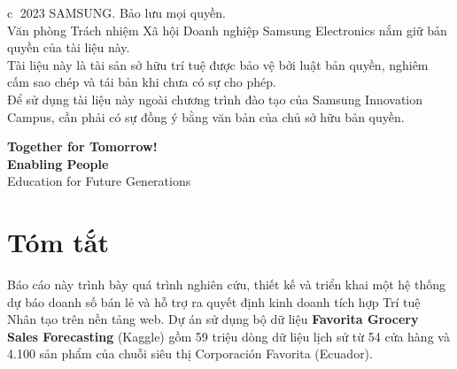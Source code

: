 \documentclass[12pt,a4paper]{report}
\begin{document}
\begin{titlepage}
\vfill

\noindent
\begin{minipage}{0.95\textwidth}
\scriptsize\color{black!80}
\textcircled{\scriptsize c} 2023 SAMSUNG. Bảo lưu mọi quyền.\\
Văn phòng Trách nhiệm Xã hội Doanh nghiệp Samsung Electronics nắm giữ bản quyền của tài liệu này.\\
Tài liệu này là tài sản sở hữu trí tuệ được bảo vệ bởi luật bản quyền, nghiêm cấm sao chép và tái bản khi chưa có sự cho phép.\\
Để sử dụng tài liệu này ngoài chương trình đào tạo của Samsung Innovation Campus, cần phải có sự đồng ý bằng văn bản của chủ sở hữu bản quyền.
\end{minipage}

\vspace{0.4cm}

\begin{center}
{\footnotesize\color{tagblue}\textbf{Together for Tomorrow!}}\\[1pt]
{\Large\color{tagblue}\textbf{Enabling People}}\\[1pt]
{\tiny\color{gray}Education for Future Generations}
\end{center}

\vspace{0.4cm}

\end{titlepage}

\tableofcontents
\cleardoublepage

\chapter*{Tóm tắt}

Báo cáo này trình bày quá trình nghiên cứu, thiết kế và triển khai một hệ thống dự báo doanh số bán lẻ và hỗ trợ ra quyết định kinh doanh tích hợp Trí tuệ Nhân tạo trên nền tảng web. Dự án sử dụng bộ dữ liệu \textbf{Favorita Grocery Sales Forecasting} (Kaggle) gồm 59 triệu dòng dữ liệu lịch sử từ 54 cửa hàng và 4.100 sản phẩm của chuỗi siêu thị Corporación Favorita (Ecuador).
\end{document}
